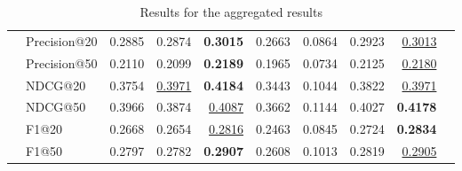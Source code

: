 \begin{table}[]
{\begin{tabular}{@{}l|l|rrrrrr|rl@{}}
                        & Precision@20 & 0.2885       & 0.2874       & \textbf{0.3015} & 0.2663 & 0.0864          & 0.2923 & {\ul {0.3013}}    &  \\
                        & Precision@50 & 0.2110       & 0.2099       & \textbf{0.2189} & 0.1965 & 0.0734          & 0.2125 & {\ul {0.2180}}    &  \\
                        & NDCG@20      & 0.3754       & {\ul{ 0.3971}} & \textbf{0.4184} & 0.3443 & 0.1044          & 0.3822 & {\ul {0.3971}}    &  \\
                        & NDCG@50      & 0.3966       & 0.3874       & {\ul {0.4087}}    & 0.3662 & 0.1144          & 0.4027 & \textbf{0.4178} &  \\
                        & F1@20        & 0.2668       & 0.2654       & {\ul{0.2816}}    & 0.2463 & 0.0845          & 0.2724 & \textbf{0.2834} &  \\
                        & F1@50        & 0.2797       & 0.2782       & \textbf{0.2907} & 0.2608 & 0.1013          & 0.2819 & {\ul{0.2905}}    &  \\ \bottomrule
\end{tabular}%
}
\caption{Results for the aggregated results}
\label{tab:aggregatedresults}
\end{table}

